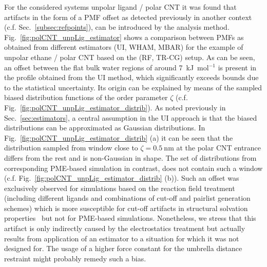 \documentclass[9pt,lessons,pubversion]{livecoms}
\begin{document}
For the considered systems unpolar ligand / polar CNT it was found that artifacts in the form of a PMF offset as detected previously in another context (c.f. Sec.~\ref{subsec:refpoints}), can be introduced by the analysis method. 
Fig.~\ref{fig:polCNT_unpLig_estimator} shows a comparison between PMFs as obtained from different estimators (UI, WHAM, MBAR) for the example of unpolar ethane / polar CNT based on the (RF, TR-CG) setup.
As can be seen, an offset between the flat bulk water regions of around 7~kJ~mol$^{-1}$ is present in the profile obtained from the UI method, which significantly exceeds bounds due to the statistical uncertainty.
Its origin can be explained by means of the sampled biased distribution functions of the order parameter $\zeta$ 
(c.f. Fig.~\ref{fig:polCNT_unpLig_estimator_distrib}). 
As noted previously in Sec.~\ref{sec:estimators}, a central assumption in the UI approach is that the biased distributions can be approximated as Gaussian distributions.
In Fig.~\ref{fig:polCNT_unpLig_estimator_distrib} (a) it can be seen that the distribution sampled from window close to $\zeta =0.5~\mathrm{nm}$ at the polar CNT entrance differs from the rest and is non-Gaussian in shape.
The set of distributions from corresponding PME-based simulation in contrast, does not contain such a window (c.f. Fig.~\ref{fig:polCNT_unpLig_estimator_distrib} (b)).
Such an offset was exclusively observed for simulations based on the reaction field treatment (including different ligands and combinations of cut-off and pairlist generation schemes) 
which is more susceptible for cut-off artifacts in structural solvation properties~\cite{reif2011computation} 
but not for PME-based simulations.
Nonetheless, we stress that this artifact is only indirectly caused by the electrostatics treatment but actually results from application of an estimator to a situation for which it was not designed for.
The usage of a higher force constant for the umbrella distance restraint might probably remedy such a bias.
\end{document}
